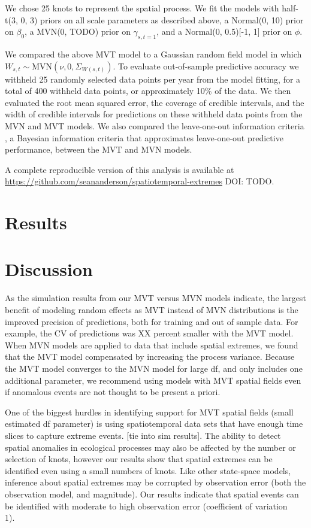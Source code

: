 \documentclass[12pt,english]{article}
\begin{document}
\begin{spacing}{1.3}
We chose 25 knots to represent the spatial process.
We fit the models with half-t(3, 0, 3) priors on all
scale parameters as described above,
a Normal(0, 10) prior on $\beta_0$,
a MVN(0, TODO) prior on $\gamma_{s,t=1}$,
and a Normal(0, 0.5)[-1, 1] prior on $\phi$.

We compared the above MVT
model to a Gaussian random field model in which
$W_{s,t} \sim \mathrm{MVN}\left(\nu, 0, \Sigma_{W(s,t)}\right)$.
To evaluate out-of-sample predictive accuracy we withheld
25 randomly selected data points
per year from the model fitting,
for a total of 400 withheld data points,
or approximately 10\% of the data.
We then evaluated the root mean squared error,
the coverage of credible intervals, and the width of credible intervals
for predictions on these withheld data points
from the MVN and MVT models.
We also compared the leave-one-out information criteria
\citep[LOOIC;][]{vehtari2016}, a Bayesian information criteria that approximates
leave-one-out predictive performance,
between the MVT and MVN models.

A complete reproducible version of this analysis is available at
\url{https://github.com/seananderson/spatiotemporal-extremes} DOI: TODO.

\section{Results}

\section{Discussion}

As the simulation results from our MVT versus MVN models indicate, the largest
benefit of modeling random effects as MVT instead of MVN distributions is the
improved precision of predictions, both for training and out of sample data.
For example, the CV of predictions was XX percent smaller with the MVT model.
When MVN models are applied to data that include spatial extremes, we found that
the MVT model compensated by increasing the process variance. Because the MVT model
converges to the MVN model for large df, and only includes one additional parameter,
we recommend using models with MVT spatial fields even if anomalous events are not
thought to be present a priori.

One of the biggest hurdles in identifying support for MVT spatial fields (small estimated
df parameter) is using spatiotemporal data sets that have enough time slices to capture
extreme events. [tie into sim results]. The ability to detect spatial anomalies in ecological
processes may also be affected by the number or selection of knots, however our results
show that spatial extremes can be identified even using a small numbers of knots. Like other
state-space models, inference about spatial extremes may be corrupted by observation
error (both the observation model, and magnitude). Our results indicate that spatial events
can be identified with moderate to high observation error (coefficient of variation ~ 1).


\end{spacing}
\end{document}
